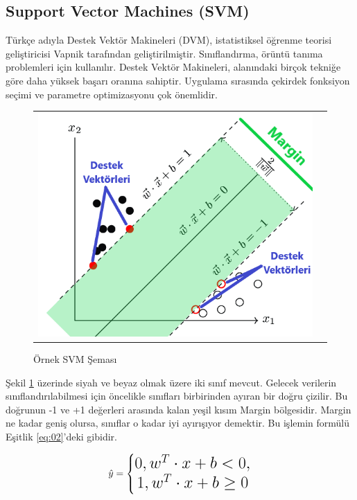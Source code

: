\documentclass[conference]{IEEEtran}
\begin{document}
\subsection{\textbf{Support Vector Machines (SVM)}}
\quad Türkçe adıyla Destek Vektör Makineleri (DVM), istatistiksel öğrenme teorisi geliştiricisi Vapnik tarafından geliştirilmiştir. Sınıflandırma, örüntü tanıma problemleri için kullanılır. Destek Vektör Makineleri, alanındaki birçok tekniğe göre daha yüksek başarı oranına sahiptir. Uygulama sırasında çekirdek fonksiyon seçimi ve parametre optimizasyonu çok önemlidir\cite{11}.

\begin{figure}[!h]
	\centering%
	\begin{center}
		\begin{tabular}{cc}%
			\includegraphics[scale=0.3]{pictures/pic_03.png}&%
		\end{tabular}%
	\end{center}
	\caption{Örnek SVM Şeması\cite{12}}%
	\label{fig:03}
\end{figure}

Şekil \ref{fig:03} üzerinde siyah ve beyaz olmak üzere iki sınıf mevcut. Gelecek verilerin sınıflandırılabilmesi için öncelikle sınıfları birbirinden ayıran bir doğru çizilir. Bu doğrunun -1 ve +1 değerleri arasında kalan yeşil kısım Margin bölgesidir. Margin ne kadar geniş olursa, sınıflar o kadar iyi ayırışıyor demektir. Bu işlemin formülü Eşitlik \ref{eq:02}'deki gibidir.

\begin{equation}
\label{eq:02}
\Large \hat{y}=\left\{\begin{matrix} 0, w^{T} \cdot x + b < 0,\\ 1, w^{T} \cdot x + b \geq 0 \end{matrix}\right.
\end{equation}
\end{document}
